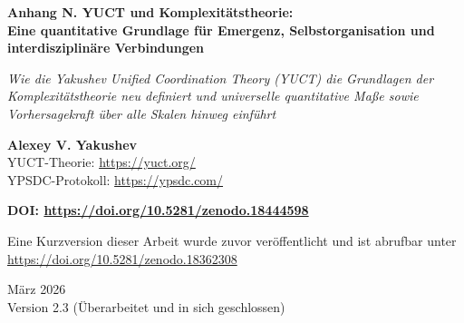 \documentclass[11pt]{article}
\theoremstyle{remark}
\begin{document}
	
	\begin{titlepage}
		\centering
		\vspace*{0cm}
		{\Huge\textbf{Anhang N. YUCT und Komplexitätstheorie: \\ Eine quantitative Grundlage für Emergenz, Selbstorganisation und interdisziplinäre Verbindungen}\par}
		\vspace{1.2cm}
		{\small\textit{Wie die Yakushev Unified Coordination Theory (YUCT) die Grundlagen der Komplexitätstheorie neu definiert und universelle quantitative Maße sowie Vorhersagekraft über alle Skalen hinweg einführt}}\par
		\vspace{1.2cm}
		{\small\textbf{Alexey V. Yakushev} \\}
		YUCT-Theorie: \url{https://yuct.org/}\\
		YPSDC-Protokoll: \url{https://ypsdc.com/}\par
		\vspace{2cm}
		\textbf{DOI: \url{https://doi.org/10.5281/zenodo.18444598}}\par
		\vspace{1cm}
		Eine Kurzversion dieser Arbeit wurde zuvor veröffentlicht und ist abrufbar unter\\ \url{https://doi.org/10.5281/zenodo.18362308}\par
		\vspace{1cm}
		März 2026 \\ Version 2.3 (Überarbeitet und in sich geschlossen)\par
		\newpage
		\begin{abstract}
			\noindent

\end{abstract}
\end{titlepage}
\end{document}
